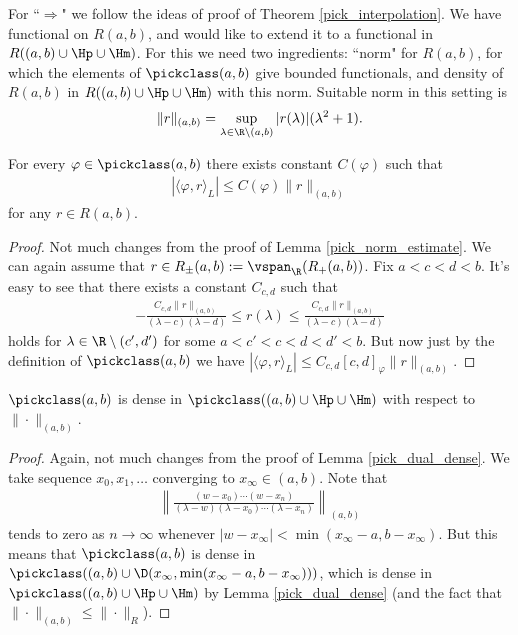 For ``$\Rightarrow$" we follow the ideas of proof of Theorem \ref{pick_interpolation}. We have functional on $R(a, b)$, and would like to extend it to a functional in $R((a, b) \cup \Hp \cup \Hm)$. For this we need two ingredients: ``norm" for $R(a, b)$, for which the elements of $\pickclass(a, b)$ give bounded functionals, and density of $R(a, b)$ in $R((a, b) \cup \Hp \cup \Hm)$ with this norm. Suitable norm in this setting is
\begin{align*}
	\|r\|_{(a, b)} = \sup_{\lambda \in \R \setminus (a, b)} |r(\lambda)| (\lambda^{2} + 1).
\end{align*}
\begin{lem}\label{pick_norm_estimate_2}
	For every $\varphi \in \pickclass(a, b)$ there exists constant $C(\varphi)$ such that
	\begin{align*}
		\left|\langle \varphi, r\rangle_{L}\right| \leq C(\varphi) \|r\|_{(a, b)}
	\end{align*}
	for any $r \in R(a, b)$.
\end{lem}
\begin{proof}
	Not much changes from the proof of Lemma \ref{pick_norm_estimate}. We can again assume that $r \in R_{\pm}(a, b) := \vspan_{\R}(R_{+}(a, b))$. Fix $a < c < d < b$. It's easy to see that there exists a constant $C_{c, d}$ such that
	\begin{align*}
		-\frac{C_{c, d}\|r\|_{(a, b)}}{(\lambda - c) (\lambda - d)} \leq r(\lambda) \leq \frac{C_{c, d}\|r\|_{(a, b)}}{(\lambda - c) (\lambda - d)}
	\end{align*}
	holds for $\lambda \in \R \setminus (c', d')$ for some $a < c' < c < d < d' < b$. But now just by the definition of $\pickclass(a, b)$ we have $|\langle \varphi, r\rangle_{L}| \leq C_{c, d} [c, d]_{\varphi} \|r\|_{(a, b)}$.
\end{proof}

\begin{lem}\label{pick_dual_dense_2}
	$\pickclass(a, b)$ is dense in $\pickclass((a, b) \cup \Hp \cup \Hm)$ with respect to $\|\cdot\|_{(a, b)}$.
\end{lem}
\begin{proof}
	Again, not much changes from the proof of Lemma \ref{pick_dual_dense}. We take sequence $x_{0}, x_{1}, \ldots $ converging to $x_{\infty} \in (a, b)$. Note that
	\begin{align*}
		\left\|\frac{(w - x_{0}) \cdots (w - x_{n})}{(\lambda - w)(\lambda - x_{0}) \cdots (\lambda - x_{n})}\right\|_{(a, b)}
	\end{align*}
	tends to zero as $n \to \infty$ whenever $|w - x_{\infty}| < \min(x_{\infty} - a, b - x_{\infty})$. But this means that $\pickclass(a, b)$ is dense in $\pickclass((a, b) \cup \D(x_{\infty}, \min(x_{\infty} - a, b - x_{\infty})))$, which is dense in $\pickclass((a, b) \cup \Hp \cup \Hm)$ by Lemma \ref{pick_dual_dense} (and the fact that $\|\cdot\|_{(a, b)} \leq \|\cdot\|_{R}$).
\end{proof}

